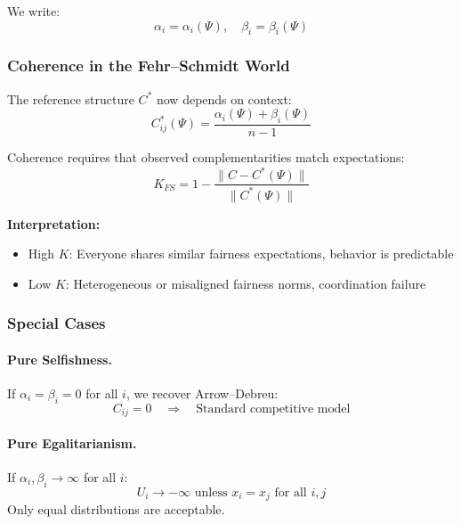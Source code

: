 \documentclass[12pt,a4paper]{article}
\begin{document}
We write:
\begin{equation}
  \alpha_i = \alpha_i(\Psi), \quad \beta_i = \beta_i(\Psi)
  \label{eq:fscontext}
\end{equation}

\subsubsection{Coherence in the Fehr--Schmidt World}

The reference structure $C^*$ now depends on context:
\begin{equation}
  C^*_{ij}(\Psi) = \frac{\alpha_i(\Psi) + \beta_i(\Psi)}{n-1}
\end{equation}

Coherence requires that observed complementarities match expectations:
\begin{equation}
  K_{FS} = 1 - \frac{\|C - C^*(\Psi)\|}{\|C^*(\Psi)\|}
\end{equation}

\textbf{Interpretation:}
\begin{itemize}
  \item High $K$: Everyone shares similar fairness expectations, behavior is predictable
  \item Low $K$: Heterogeneous or misaligned fairness norms, coordination failure
\end{itemize}

\subsubsection{Special Cases}

\paragraph{Pure Selfishness.}
If $\alpha_i = \beta_i = 0$ for all $i$, we recover Arrow--Debreu:
\begin{equation}
  C_{ij} = 0 \quad \Rightarrow \quad \text{Standard competitive model}
\end{equation}

\paragraph{Pure Egalitarianism.}
If $\alpha_i, \beta_i \to \infty$ for all $i$:
\begin{equation}
  U_i \to -\infty \text{ unless } x_i = x_j \text{ for all } i,j
\end{equation}
Only equal distributions are acceptable.
\end{document}
